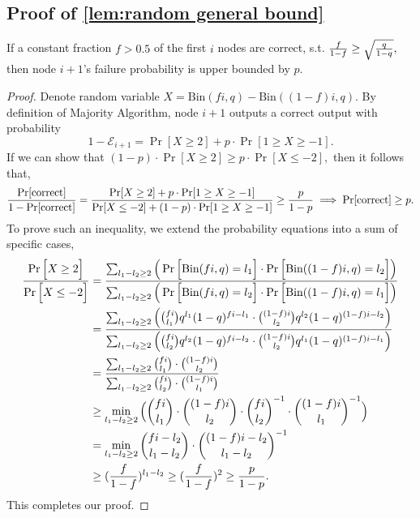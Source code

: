 \documentclass[a4paper,UKenglish]{lipics}
\theoremstyle{definition}
\begin{document}
\subsection{Proof of \ref{lem:random general bound}}
\label{subsec:random general bound}

If a constant fraction $f > 0.5$ of the first $i$ nodes are correct, s.t.
$
	{f\over 1-f} \ge \sqrt{q\over 1-q},
$
then node $i+1$'s failure probability is upper bounded by $p$. 

\begin{proof}
Denote random variable $X = \text{Bin}(fi, q) - \text{Bin}((1-f)i, q)$. 
By definition of Majority Algorithm, node $i+1$ outputs a correct output with probability
\begin{equation*}
	1 - \mathcal{E}_{i+1}
=
	\Pr[ X \ge 2]
	+
	p\cdot \Pr[ 1 \ge X \ge -1].
\end{equation*}
If we can show that 
$
	(1-p)\cdot\Pr[ X \ge 2 ] 
	\ge 
	p\cdot\Pr[ X \le -2 ],
$
then it follows that,
\begin{align*}
	{\Pr[\text{correct}]\over 1 - \Pr[\text{correct}]} 
=
	{\Pr[ X \ge 2]+ p\cdot \Pr[ 1 \ge X \ge -1] \over \Pr[ X \le -2]+ (1-p)\cdot \Pr[ 1 \ge X \ge -1]} 
\ge
	{p\over 1-p}
\implies
	\Pr[\text{correct}]
\ge
	p.
\end{align*}
To prove such an inequality, we extend the probability equations into a sum of specific cases,
\begin{align*}
	{\Pr \Big[ X \ge 2 \Big] \over \Pr\Big[ X \le -2 \Big]}
& =
	{\sum_{l_1 - l_2 \ge 2} \Big( \Pr\Big[ \text{Bin}(fi, q) = l_1 \Big]\cdot \Pr\Big[ \text{Bin}((1-f)i, q) = l_2 \Big] \Big)
	\over
	\sum_{l_1 - l_2 \ge 2} \Big( \Pr\Big[ \text{Bin}(fi, q) = l_2 \Big]\cdot \Pr\Big[ \text{Bin}((1-f)i, q) = l_1 \Big] \Big) }
\\
& =
	{\sum_{l_1 - l_2 \ge 2} \Big( {fi\choose l_1} q^{l_1}(1-q)^{fi - l_1}\cdot {(1-f)i\choose l_2} q^{l_2}(1-q)^{(1-f)i - l_2} \Big)
	\over
	\sum_{l_1 - l_2 \ge 2} \Big( {fi\choose l_2} q^{l_2}(1-q)^{fi - l_2}\cdot {(1-f)i\choose l_2} q^{l_1}(1-q)^{(1-f)i - l_1} \Big) }
\\
& =
	{\sum_{l_1 - l_2 \ge 2} {fi\choose l_1} \cdot {(1-f)i\choose l_2} 
	\over
	\sum_{l_1 - l_2 \ge 2} {fi\choose l_2} \cdot {(1-f)i\choose l_1}  }
\\
& \ge
	\min_{l_1 - l_2\ge 2} \Big( {fi\choose l_1} \cdot {(1-f)i\choose l_2}\cdot {fi\choose l_2}^{-1} \cdot {(1-f)i\choose l_1}^{-1} \Big)
\\
& =
	\min_{l_1 - l_2\ge 2} {fi - l_2 \choose l_1 - l_2} \cdot {(1-f)i - l_2 \choose l_1 - l_2}^{-1} \\
& \ge
	({f\over 1-f})^{l_1 - l_2}
	\ge
	({f\over 1-f})^2
	\ge {p\over 1-p}.
\end{align*}
This completes our proof.
\end{proof}
\end{document}
